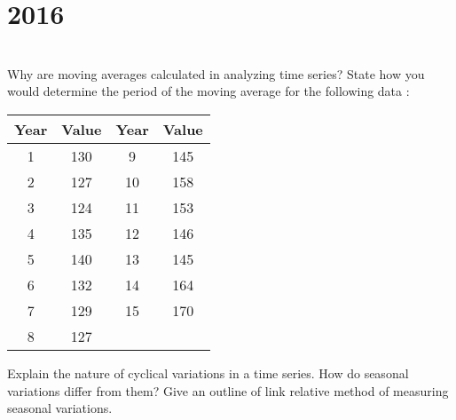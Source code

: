 \section*{2016}
\vspace{-.5cm}
\hrulefill \smallskip\\
 Why are moving averages calculated in analyzing time series? State how you would determine the period of the moving average for the following data : 
\begin{center}
    \begin{tabular}{|c|c|c|c|} \hline
    Year & Value & Year & Value \\ \hline
    1 & 130 & 9 & 145  \\
    2 & 127 & 10 & 158 \\
    3 & 124 & 11 & 153\\
    4 & 135  & 12 & 146\\
    5 & 140 & 13 & 145\\
    6 & 132 & 14 & 164\\
    7 & 129 & 15 & 170\\
    8 & 127 & &\\ \hline
\end{tabular}
\end{center}
 Explain the nature of cyclical variations in a time series. How do seasonal variations differ from them? Give an outline of link relative method of measuring seasonal variations.
